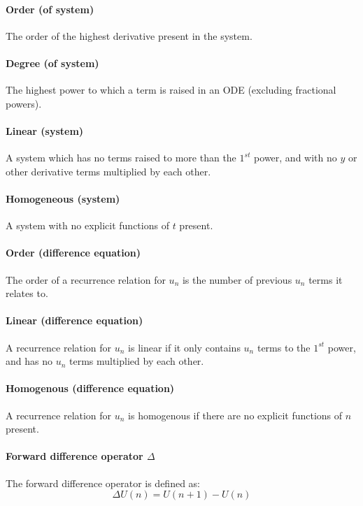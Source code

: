 \documentclass{scrartcl}
\begin{document}
\paragraph{Order (of system)}
The order of the highest derivative present in the system.

\paragraph{Degree (of system)}
The highest power to which a term is raised in an ODE (excluding fractional powers).

\paragraph{Linear (system)}
A system which has no terms raised to more than the $ 1^{st} $ power, and with no $ y $ or other derivative terms multiplied by each other.

\paragraph{Homogeneous (system)}
A system with no explicit functions of $ t $ present.

\paragraph{Order (difference equation)}
The order of a recurrence relation for $ u_{n} $ is the number of previous $ u_{n} $ terms it relates to.

\paragraph{Linear (difference equation)}
A recurrence relation for $ u_{n} $ is linear if it only contains $ u_{n} $ terms to the $ 1^{st} $ power, and has no $ u_{n} $ terms multiplied by each other.

\paragraph{Homogenous (difference equation)}
A recurrence relation for $ u_{n} $ is homogenous if there are no explicit functions of $ n $ present.

\paragraph{Forward difference operator $ \Delta $}
The forward difference operator is defined as:
\begin{equation}
\Delta U(n) = U(n+1) - U(n)
\end{equation}
\end{document}
